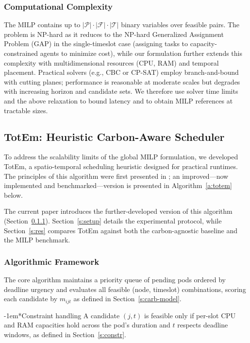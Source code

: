 \documentclass[10pt,journal,compsoc]{IEEEtran}
\makeatletter
\renewcommand{\paragraph}{\@startsection{paragraph}{4}{0pt}{1.5ex plus 1.5ex minus 0.5ex}%
{-1em}{\normalfont\normalsize\bfseries}}
\makeatother
\begin{document}
\subsubsection{Computational Complexity}\label{s:milp-complex}

The MILP contains up to $|\mathcal{P}| \cdot |\mathcal{F}| \cdot |\mathcal{T}|$ binary variables over feasible pairs. The problem is NP-hard as it reduces to the NP-hard Generalized Assignment Problem (GAP) in the single-timeslot case (assigning tasks to capacity-constrained agents to minimize cost), while our formulation further extends this complexity with multidimensional resources (CPU, RAM) and temporal placement. Practical solvers (e.g., CBC or CP-SAT) employ branch-and-bound with cutting planes; performance is reasonable at moderate scales but degrades with increasing horizon and candidate sets. We therefore use solver time limits and the above relaxation to bound latency and to obtain MILP references at tractable sizes.

\subsection{TotEm: Heuristic Carbon-Aware Scheduler}
\label{s:totem}

To address the scalability limits of the global MILP formulation, we developed TotEm, a spatio-temporal scheduling heuristic designed for practical runtimes. The principles of this algorithm were first presented in \cite{asadov2025}; an improved---now implemented and benchmarked---version is presented in Algorithm~\ref{a:totem} below.

The current paper introduces the further-developed version of this algorithm (Section~\ref{s:algo-frame}). Section~\ref{s:setup} details the experimental protocol, while Section~\ref{s:res} compares TotEm against both the carbon-agnostic baseline and the MILP benchmark.


\subsubsection{Algorithmic Framework}\label{s:algo-frame}

The core algorithm maintains a priority queue of pending pods ordered by deadline urgency and evaluates all feasible (node, timeslot) combinations, scoring each candidate by $m_{ijt}$ as defined in Section~\ref{s:carb-model}.

\paragraph*{Constraint handling}
A candidate $(j,t)$ is feasible only if per-slot CPU and RAM capacities hold across the pod's duration and $t$ respects deadline windows, as defined in Section~\ref{s:constr}.
\end{document}
